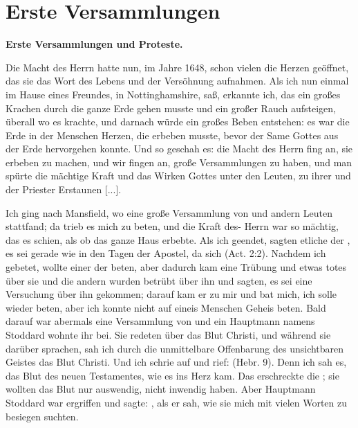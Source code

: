 \chapter[Erste Versammlungen]{Erste Versammlungen}

\begin{center}
\textbf{Erste Versammlungen und Proteste.}
\end{center}

Die Macht des Herrn hatte nun, im Jahre 1648, schon vielen
die Herzen geöffnet, das sie das Wort des Lebens und der 
Versöhnung aufnahmen. Als ich nun einmal im Hause eines Freundes,
in Nottinghamshire, saß, erkannte ich, das ein großes Krachen
durch die ganze Erde gehen musste und ein großer Rauch 
aufsteigen, überall wo es krachte, und darnach würde ein großes
Beben entstehen: es war die Erde in der Menschen Herzen, die
erbeben musste, bevor der Same Gottes aus der Erde 
hervorgehen konnte. Und so geschah es: die Macht des Herrn fing an,
sie erbeben zu machen, und wir fingen an, große Versammlungen
zu haben, und man spürte die mächtige Kraft und das Wirken
Gottes unter den Leuten, zu ihrer und der Priester Erstaunen [...].

Ich ging nach Mansfield, wo eine große Versammlung von
 und andern Leuten stattfand; da trieb es mich zu
beten, und die Kraft des- Herrn war so mächtig, das es schien,
als ob das ganze Haus erbebte. Als ich geendet, sagten etliche
der , es sei gerade wie in den Tagen der Apostel, da
sich  
(Act. 2:2).
Nachdem ich gebetet, wollte einer der  beten, aber
dadurch kam eine Trübung und etwas totes über sie und die
andern  wurden betrübt über ihn und sagten, es sei
eine Versuchung über ihn gekommen; darauf kam er zu mir und
bat mich, ich solle wieder beten, aber ich konnte nicht auf 
eineis Menschen Geheis beten.
Bald darauf war abermals eine Versammlung von 
und ein Hauptmann namens Stoddard wohnte ihr bei. Sie
redeten über das Blut Christi, 
und während sie darüber sprachen,
sah ich durch die unmittelbare Offenbarung des unsichtbaren
Geistes das Blut Christi. Und ich schrie auf und rief:  (Hebr. 9). 
Denn ich sah es, das Blut des neuen Testamentes, 
wie es ins Herz kam. Das
erschreckte die ; sie wollten das Blut nur 
auswendig, nicht inwendig haben. Aber 
Hauptmann Stoddard war ergriffen
und sagte: , als er sah,
wie sie mich mit vielen Worten zu besiegen suchten.

